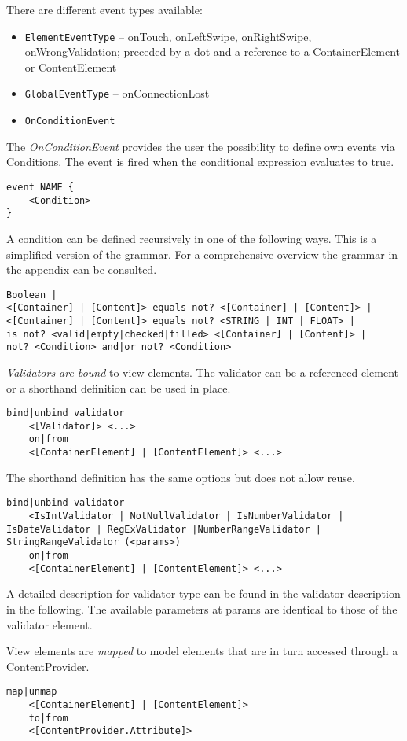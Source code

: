 There are different event types available:
\begin{itemize}
\item \lstinline!ElementEventType! -- onTouch, onLeftSwipe, onRightSwipe, onWrongValidation; preceded by a dot and a reference to a ContainerElement or ContentElement
\item \lstinline!GlobalEventType! -- onConnectionLost
\item \lstinline!OnConditionEvent!
\end{itemize}


The \textit{OnConditionEvent} provides the user the possibility to define own events via Conditions. The event is fired when the conditional expression evaluates to true.
\begin{lstlisting}
event NAME {
	<Condition>
}
\end{lstlisting}

A condition can be defined recursively in one of the following ways. This is a simplified version of the grammar. For a comprehensive overview the grammar in the appendix can be consulted.
\begin{lstlisting}
Boolean |
<[Container] | [Content]> equals not? <[Container] | [Content]> |
<[Container] | [Content]> equals not? <STRING | INT | FLOAT> |
is not? <valid|empty|checked|filled> <[Container] | [Content]> |
not? <Condition> and|or not? <Condition>
\end{lstlisting}

\textit{Validators are bound} to view elements. The validator can be a referenced element or a shorthand definition can be used in place.
\begin{lstlisting}
bind|unbind validator
	<[Validator]> <...>
	on|from
	<[ContainerElement] | [ContentElement]> <...>
\end{lstlisting}

The shorthand definition has the same options but does not allow reuse.
\begin{lstlisting}
bind|unbind validator
	<IsIntValidator | NotNullValidator | IsNumberValidator | IsDateValidator | RegExValidator |NumberRangeValidator | StringRangeValidator (<params>)
	on|from
	<[ContainerElement] | [ContentElement]> <...>
\end{lstlisting}

A detailed description for validator type can be found in the validator description in the following. The available parameters at params are identical to those of the validator element.

View elements are \textit{mapped} to model elements that are in turn accessed through a ContentProvider.
\begin{lstlisting}
map|unmap
	<[ContainerElement] | [ContentElement]>
	to|from
	<[ContentProvider.Attribute]>

\end{lstlisting}

